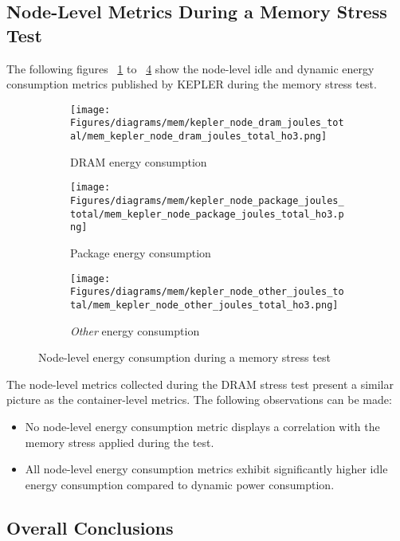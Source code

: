 \subsection{Node-Level Metrics During a Memory Stress Test}

The following figures ~\ref{fig:mem_kepler_node_dram_joules_total} to ~\ref{fig:mem_kepler_node_other_joules_total} show the node-level idle and dynamic energy consumption metrics published by KEPLER during the memory stress test.

\begin{figure}[H]
    \centering
    \begin{subfigure}{1\textwidth}
        \texttt{[image: Figures/diagrams/mem/kepler\_node\_dram\_joules\_total/mem\_kepler\_node\_dram\_joules\_total\_ho3.png]}
        \caption{DRAM energy consumption}
        \label{fig:mem_kepler_node_dram_joules_total}
    \end{subfigure}
    \begin{subfigure}{0.49\textwidth}
        \texttt{[image: Figures/diagrams/mem/kepler\_node\_package\_joules\_total/mem\_kepler\_node\_package\_joules\_total\_ho3.png]}
        \caption{Package energy consumption}
        \label{fig:mem_kepler_node_package_joules_total}
    \end{subfigure}
    \begin{subfigure}{0.49\textwidth}
        \texttt{[image: Figures/diagrams/mem/kepler\_node\_other\_joules\_total/mem\_kepler\_node\_other\_joules\_total\_ho3.png]}
        \caption{\textit{Other} energy consumption}
        \label{fig:mem_kepler_node_other_joules_total}
    \end{subfigure}
    \caption{Node-level energy consumption during a memory stress test}
\end{figure}

The node-level metrics collected during the DRAM stress test present a similar picture as the container-level metrics. The following observations can be made:
\begin{itemize}
    \item No node-level energy consumption metric displays a correlation with the memory stress applied during the test.
    \item All node-level energy consumption metrics exhibit significantly higher idle energy consumption compared to dynamic power consumption.
\end{itemize}

\subsection{Overall Conclusions}

